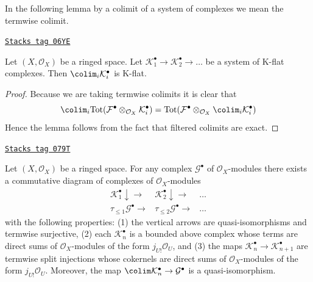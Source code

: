 In the following lemma by a colimit of a system of complexes we mean
the termwise colimit.

\begin{lemma}
\label{cohomology-lemma-colimit-K-flat}
\href{https://stacks.math.columbia.edu/tag/06YE}{\texttt{Stacks tag 06YE}}

Let $(X, \mathcal{O}_X)$ be a ringed space.
Let $\mathcal{K}_1^\bullet \to \mathcal{K}_2^\bullet \to \ldots$
be a system of K-flat complexes.
Then $\colim_i \mathcal{K}_i^\bullet$ is K-flat.
\end{lemma}

\begin{proof}
Because we are taking termwise colimits it is clear that
$$
\colim_i \text{Tot}(
\mathcal{F}^\bullet \otimes_{\mathcal{O}_X} \mathcal{K}_i^\bullet)
=
\text{Tot}(\mathcal{F}^\bullet \otimes_{\mathcal{O}_X}
\colim_i \mathcal{K}_i^\bullet)
$$
Hence the lemma follows from the fact that filtered colimits are
exact.
\end{proof}

\begin{lemma}
\label{cohomology-lemma-resolution-by-direct-sums-extensions-by-zero}
\href{https://stacks.math.columbia.edu/tag/079T}{\texttt{Stacks tag 079T}}

Let $(X, \mathcal{O}_X)$ be a ringed space.
For any complex $\mathcal{G}^\bullet$ of $\mathcal{O}_X$-modules
there exists a commutative diagram of complexes of $\mathcal{O}_X$-modules
$$
\begin{array}{ccc}\mathcal{K}_1^\bullet \downarrow\longrightarrow & \mathcal{K}_2^\bullet \downarrow\longrightarrow & \ldots \\ \tau_{\leq 1}\mathcal{G}^\bullet \longrightarrow & \tau_{\leq 2}\mathcal{G}^\bullet \longrightarrow & \ldots\end{array}
$$
with the following properties: (1) the vertical arrows are quasi-isomorphisms
and termwise surjective,
(2) each $\mathcal{K}_n^\bullet$ is a bounded above complex whose terms
are direct sums of $\mathcal{O}_X$-modules of the form
$j_{U!}\mathcal{O}_U$, and
(3) the maps $\mathcal{K}_n^\bullet \to \mathcal{K}_{n + 1}^\bullet$ are
termwise split injections whose cokernels are direct sums of
$\mathcal{O}_X$-modules of the form $j_{U!}\mathcal{O}_U$. Moreover, the map
$\colim \mathcal{K}_n^\bullet \to \mathcal{G}^\bullet$ is a quasi-isomorphism.
\end{lemma}

